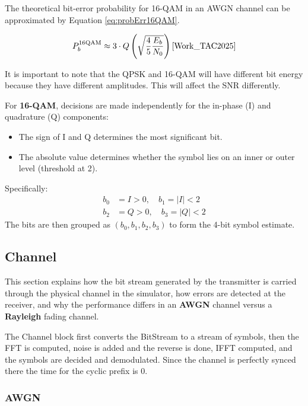 The theoretical bit-error probability for 16-QAM in an AWGN channel can be approximated by Equation \ref{eq:probErr16QAM}.

\begin{equation}
  P_b^{\text{16QAM}} \approx 3\cdot Q\left(\sqrt{\frac{4}{5}\frac{E_b}{N_0}}\right)\text{\cite{Work_TAC2025}}
  \label{eq:probErr16QAM}
\end{equation}

It is important to note that the QPSK and 16-QAM will have different bit energy because they have different amplitudes. This will affect the SNR differently.

For \textbf{16-QAM}, decisions are made independently for the in-phase (I) and quadrature (Q) components:
\begin{itemize}
  \item The sign of I and Q determines the most significant bit.
  \item The absolute value determines whether the symbol lies on an inner or outer level (threshold at 2).
\end{itemize}
Specifically:
\begin{align*}
  b_0 &= I > 0, \quad b_1 = |I| < 2 \\
  b_2 &= Q > 0, \quad b_3 = |Q| < 2
\end{align*}
The bits are then grouped as $(b_0, b_1, b_2, b_3)$ to form the 4-bit symbol estimate.

\subsection{Channel}

\label{sec:channel}

This section explains how the bit stream generated by the transmitter is carried through the physical channel in the simulator, how errors are detected at the receiver, and why the performance differs in an \textbf{AWGN} channel versus a \textbf{Rayleigh} fading channel.

The Channel block first converts the BitStream to a stream of symbols, then the FFT is computed, noise is added and the reverse is done, IFFT computed, and the symbols are decided and demodulated. Since the channel is perfectly synced there the time for the cyclic prefix is 0.

\subsubsection{AWGN}

